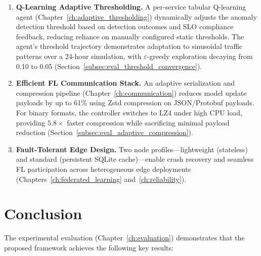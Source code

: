\begin{enumerate}
    \item \textbf{Q-Learning Adaptive Thresholding.} A per-service tabular
    Q-learning agent (Chapter~\ref{ch:adaptive_thresholding}) dynamically
    adjusts the anomaly detection threshold based on detection outcomes and
    SLO compliance feedback, reducing reliance on manually configured static
    thresholds. The agent's threshold trajectory demonstrates adaptation to
    sinusoidal traffic patterns over a 24-hour simulation, with
    $\varepsilon$-greedy exploration decaying from 0.10 to 0.05
    (Section~\ref{subsec:eval_threshold_convergence}).

    \item \textbf{Efficient FL Communication Stack.} An adaptive serialization
    and compression pipeline (Chapter~\ref{ch:communication}) reduces model
    update payloads by up to 61\% using Zstd compression on JSON/Protobuf
    payloads. For binary formats, the controller switches to LZ4 under high CPU load,
    providing $5.8\times$ faster compression while sacrificing minimal
    payload reduction (Section~\ref{subsec:eval_adaptive_compression}).

    \item \textbf{Fault-Tolerant Edge Design.} Two node profiles---lightweight
    (stateless) and standard (persistent SQLite cache)---enable crash recovery
    and seamless FL participation across heterogeneous edge deployments
    (Chapters~\ref{ch:federated_learning} and~\ref{ch:reliability}).
\end{enumerate}

\section{Conclusion}
\label{sec:conclusion_conclusion}

The experimental evaluation (Chapter~\ref{ch:evaluation}) demonstrates that
the proposed framework achieves the following key results:

